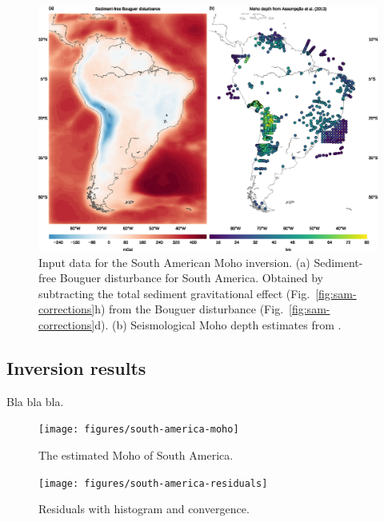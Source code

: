\documentclass[extra,mreferee]{gji}
\begin{document}
\begin{figure}
    \centering
    \includegraphics[width=\textwidth]{figures/south-america-data}
    \caption{
        Input data for the South American Moho inversion.
        (a) Sediment-free Bouguer disturbance for South America.
        Obtained by subtracting the total sediment gravitational effect
        (Fig.~\ref{fig:sam-corrections}h) from the Bouguer disturbance
        (Fig.~\ref{fig:sam-corrections}d).
        (b) Seismological Moho depth estimates from
        \citet{assumpcao2012}.
    }
    \label{fig:sam-data}
\end{figure}


\subsection{Inversion results}

Bla bla bla.

\begin{figure}
    \centering
    \texttt{[image: figures/south-america-moho]}
    \caption{The estimated Moho of South America.}
    \label{fig:sam-moho}
\end{figure}

\begin{figure}
    \centering
    \texttt{[image: figures/south-america-residuals]}
    \caption{Residuals with histogram and convergence.}
    \label{fig:sam-residuals}
\end{figure}
\end{document}
